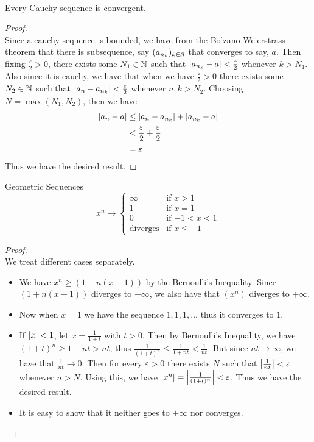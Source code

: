 \documentclass[a4paper]{article}
\begin{document}
\begin{prp}{}{}\\ Every Cauchy sequence is convergent. 
\begin{proof}\\ Since a cauchy sequence is bounded, we have from the Bolzano Weierstrass theorem that there is subsequence, say $(a_{n_k})_{k\in\mathbb{N}}$ that converges to say, $a$. Then fixing $\frac{\varepsilon}{2}>0$, there exists some $N_1\in\mathbb{N}$ such that $\abs{a_{n_k}-a}<\frac{\varepsilon}{2}$ whenever $k>N_1$. Also since it is cauchy, we have that when we have $\frac{\varepsilon}{2}>0$ there exists some $N_2\in\mathbb{N}$ such that $\abs{a_n-a_{n_k}}<\frac{\varepsilon}{2}$ whenever $n,k>N_2$. Choosing $N=\max{(N_1,N_2)}$, then we have 
\begin{align*}
\abs{a_n-a}&\leq\abs{a_n-a_{n_k}}+\abs{a_{n_k}-a} \\
&<\frac{\varepsilon}{2}+\frac{\varepsilon}{2} \\
&=\varepsilon
\end{align*}
Thus we have the desired result. 
\end{proof}
\end{prp}

\begin{thm}{Geometric Sequences}{}\\ $$x^n\to\begin{cases}
\infty & \text{if $x>1$} \\
1 & \text{if $x=1$} \\
0 & \text{if $-1<x<1$} \\
\text{diverges} & \text{if $x\leq-1$}
\end{cases}$$
\begin{proof}\\ We treat different cases separately. 
\begin{itemize}
\item We have $x^n\geq(1+n(x-1))$ by the Bernoulli's Inequality. Since $(1+n(x-1))$ diverges to $+\infty$, we also have that $(x^n)$ diverges to $+\infty$. 
\item Now when $x=1$ we have the sequence $1,1,1,\dots$ thus it converges to $1$. 
\item If $\abs{x}<1$, let $x=\frac{1}{1+t}$ with $t>0$. Then by Bernoulli's Inequality, we have $(1+t)^n\geq1+nt>nt$, thus $\frac{1}{(1+t)^n}\leq\frac{1}{1+nt}<\frac{1}{nt}$. But since $nt\to\infty$, we have that $\frac{1}{nt}\to 0$. Then for every $\varepsilon>0$ there exists $N$ such that $\abs{\frac{1}{nt}}<\varepsilon$ whenever $n>N$. Using this, we have $\abs{x^n}=\abs{\frac{1}{(1+t)^n}}<\varepsilon$. Thus we have the desired result. 
\item It is easy to show that it neither goes to $\pm\infty$ nor converges. 
\end{itemize}
\end{proof}
\end{thm}
\end{document}
